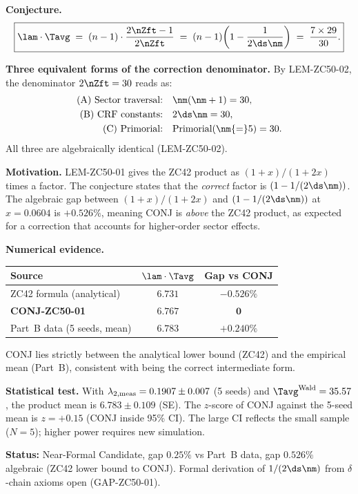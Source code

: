 \documentclass[12pt, a4paper]{article}
\begin{document}
\begin{formalbox}[title={CONJ-ZC50-01: Wald Correction Identity
  (Near-Formal Candidate, gap $0.25\%$)}]
\textbf{Conjecture.}
\begin{equation}\label{zc50:eq:conj}
  \boxed{
  \lam\cdot\Tavg
  \;=\; (n-1)\cdot\frac{2\nZft-1}{2\nZft}
  \;=\; (n-1)\!\left(1 - \frac{1}{2\ds\nm}\right)
  \;=\; \frac{7\times 29}{30}.
  }
\end{equation}

\textbf{Three equivalent forms of the correction denominator.}
By LEM-ZC50-02, the denominator $2\nZft = 30$ reads as:
\begin{align*}
  \text{(A) Sector traversal:}\quad &\nm(\nm+1) = 30, \\
  \text{(B) CRF constants:}\quad    &2\ds\nm = 30, \\
  \text{(C) Primorial:}\quad        &\text{Primorial}(\nm{=}5) = 30.
\end{align*}
All three are algebraically identical (LEM-ZC50-02).

\textbf{Motivation.}
LEM-ZC50-01 gives the ZC42 product as $(1+x)/(1+2x)$ times a
factor. The conjecture states that the \emph{correct} factor is
$(1-1/(2\ds\nm))$. The algebraic gap between
$(1+x)/(1+2x)$ and $(1-1/(2\ds\nm))$ at $x=0.0604$ is $+0.526\%$,
meaning CONJ is \emph{above} the ZC42 product, as expected for a
correction that accounts for higher-order sector effects.

\textbf{Numerical evidence.}
\begin{center}
\begin{tabular}{@{}lcc@{}}
\toprule
Source & $\lam\cdot\Tavg$ & Gap vs CONJ \\
\midrule
ZC42 formula (analytical)   & $6.731$ & $-0.526\%$ \\
\textbf{CONJ-ZC50-01}       & $\mathbf{6.767}$ & $\mathbf{0}$ \\
Part~B data (5 seeds, mean) & $6.783$ & $+0.240\%$ \\
\bottomrule
\end{tabular}
\end{center}
CONJ lies strictly between the analytical lower bound (ZC42) and the
empirical mean (Part~B), consistent with being the correct
intermediate form.

\textbf{Statistical test.}
With $\lambda_{2,{\rm meas}} = 0.1907\pm0.007$ (5 seeds) and
$\Tavg^{\rm Wald} = 35.57$, the product mean is
$6.783\pm0.109$ (SE). The $z$-score of CONJ against the 5-seed
mean is $z = +0.15$ (CONJ inside 95\% CI). The large CI reflects the
small sample ($N=5$); higher power requires new simulation.

\textbf{Status:} Near-Formal Candidate, gap $0.25\%$ vs Part~B data,
gap $0.526\%$ algebraic (ZC42 lower bound to CONJ).
Formal derivation of $1/(2\ds\nm)$ from $\delta$-chain axioms
open (GAP-ZC50-01).
\end{formalbox}
\end{document}
